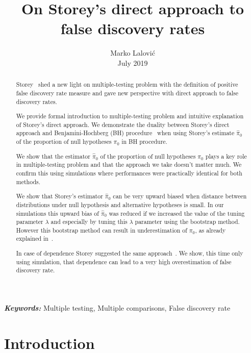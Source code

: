 \documentclass[10pt]{article}
\providecommand{\keywords}[1]{\textbf{\textit{Keywords:}} #1}
\begin{document}
\title{On Storey's direct approach to false discovery rates}
\author{Marko Lalović
\\
July 2019 \\
}

\maketitle

\begin{abstract}
Storey~\cite{Storey} shed a new light on multiple-testing problem with the definition of positive false discovery rate measure and gave new perspective with direct approach to false discovery rates.

We provide formal introduction to multiple-testing problem and intuitive explanation of Storey's direct approach. We demonstrate the duality between Storey's direct approach and Benjamini-Hochberg (BH) procedure~\cite{BH} when using Storey's estimate $\widehat{\pi}_{0}$ of the proportion of null hypotheses $\pi_{0}$ in BH procedure. 

We show that the estimator $\widehat{\pi}_{0}$ of the proportion of null hypotheses $\pi_{0}$ plays a key role in multiple-testing problem and that the approach we take doesn't matter much. We confirm this using simulations where performances were practically identical for both methods.

We show that Storey's estimator $\widehat{\pi}_{0}$ can be very upward biased when distance between distributions under null hypothesis and alternative hypotheses is small. In our simulations this upward bias of $\widehat{\pi}_{0}$ was reduced if we increased the value of the tuning parameter $\lambda$ and especially by tuning this $\lambda$ parameter using the bootstrap method. However this bootstrap method can result in underestimation of $\pi_{0}$, as already explained in~\cite{Black}. 

In case of dependence Storey suggested the same approach~\cite{Dependence}. We show, this time only using simulation, that dependence can lead to a very high overestimation of false discovery rate.
\end{abstract}

\keywords{Multiple testing, Multiple comparisons, False discovery rate}

\tableofcontents

\section{Introduction} \label{sec: intro}
\end{document}
